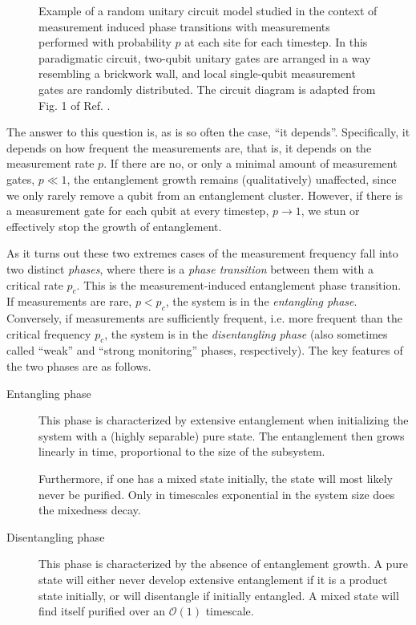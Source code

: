 \begin{figure}[t]
  \centering
  
  \caption{Example of a random unitary circuit model studied in the context of
    measurement induced phase transitions with measurements performed with
    probability $p$ at each site for each timestep. In this paradigmatic
    circuit, two-qubit unitary gates are arranged in a way resembling a
    brickwork wall, and local single-qubit measurement gates are randomly
  distributed. The circuit diagram is adapted from Fig. 1 of Ref.
\cite{liMeasurementdrivenEntanglementTransition2019}.}
  \label{fig:hybrid-circuit}
\end{figure}

The answer to this question is, as is so often the case, \enquote{it depends}.
Specifically, it depends on how frequent the measurements are, that is, it
depends on the
measurement rate $p$. If there are no, or only a minimal amount of measurement
gates, $p\ll 1$, the entanglement growth remains (qualitatively) unaffected,
since we only rarely remove a qubit from an entanglement cluster. However, if
there is a measurement gate for each qubit at every timestep, $p\to 1$, we stun
or effectively stop the growth of entanglement.

As it turns out these two extremes cases of the measurement frequency fall into
two distinct \emph{phases}, where there is a \emph{phase transition} between
them with a critical rate $p_c$. This is the measurement-induced entanglement phase transition. If
measurements are rare, $p<p_c$, the system is in the \emph{entangling phase}.
Conversely, if measurements are sufficiently frequent, i.e. more frequent than
the critical frequency $p_c$, the system is in the \emph{disentangling phase}
(also sometimes called \enquote{weak} and \enquote{strong monitoring} phases,
respectively). The key features of the two phases are as follows.

\begin{description}
  \item[Entangling phase] This phase is characterized by extensive entanglement
    when initializing the system with a (highly separable) pure state. The
    entanglement then grows linearly in time, proportional to the size of the
    subsystem.

    Furthermore, if one has a mixed state initially, the state will most likely
    never be purified. Only in timescales exponential in the system size does
    the mixedness decay.
  \item[Disentangling phase] This phase is characterized by the absence of
    entanglement growth. A pure state will either never develop extensive
    entanglement if it is a product state initially, or will disentangle if
    initially entangled.
    A mixed state will find itself purified over an $\mathcal{O}(1)$ timescale.
\end{description}

